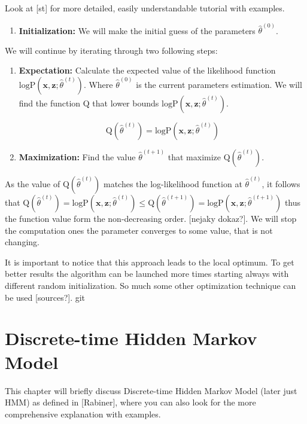 \documentclass[thesis=M,english]{FITthesis}[2012/10/20]
\begin{document}
Look at [st] for more detailed, easily understandable tutorial with examples.    

\begin{enumerate}
\item \textbf{Initialization:} We will make the initial guess of the parameters $\hat \theta^{(0)} $.
\end{enumerate} 

We will continue by iterating through two following steps: 

\begin{enumerate}[resume]
\item \textbf{Expectation:} Calculate the expected value of the likelihood function $\mathrm{logP}(\mathbf{x},\mathbf{z};\hat \theta^{(t)})$. Where $\hat \theta^{(0)}$ is the current parameters estimation. We will find the function $\mathrm{Q}$ that lower bounds $\mathrm{logP}(\mathbf{x},\mathbf{z};\hat \theta^{(t)})$.

\begin{equation}\label{eq:exp}
 \mathrm{Q}(\hat\theta^{(t)}) =  \mathrm{logP}(\mathbf{x},\mathbf{z};\hat \theta^{(t)})
\end{equation}

\item \textbf{Maximization:} Find the value $\hat\theta^{(t+1)}$ that maximize $\mathrm{Q}(\hat\theta^{(t)})$.  
\end{enumerate}  

As the value of $\mathrm{Q}(\hat\theta^{(t)})$ matches the log-likelihood function at $\hat\theta^{(t)}$, it follows that $ \mathrm{Q}(\hat\theta^{(t)}) =  \mathrm{logP}(\mathbf{x},\mathbf{z};\hat \theta^{(t)}) \leq \mathrm{Q}(\hat\theta^{(t+1)}) =  \mathrm{logP}(\mathbf{x},\mathbf{z};\hat \theta^{(t+1)}) $ thus the function value form the non-decreasing order. [nejaky dokaz?]. We will stop the computation ones the parameter converges to some value, that is not changing.  

It is important to notice that this approach leads to the local optimum. To get better results the algorithm can be launched more times starting always with different random initialization. So much some other optimization technique can be used [sources?].    
git 



\chapter{Discrete-time Hidden Markov Model}
This chapter will briefly discuss Discrete-time Hidden Markov Model (later just HMM) as defined in [Rabiner], where you can also look for the more comprehensive explanation with examples.
\end{document}
